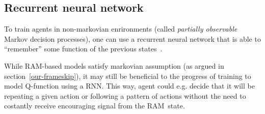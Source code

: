 \subsection{Recurrent neural network}
To train agents in non-markovian enrironments (called \emph{partially observable} Markov decision processes), one can use a recurrent neural network that is able to ``remember'' some function of the previous states~\cite{minecraft-pomdp}.

While RAM-based models satisfy markovian assumption (as argued in section~\ref{our-frameskip}), it may still be beneficial to the progress of training to model Q-function using a RNN. This way, agent could e.g. decide that it will be repeating a given action or following a pattern of actions without the need to costantly receive encouraging signal from the RAM~state.

